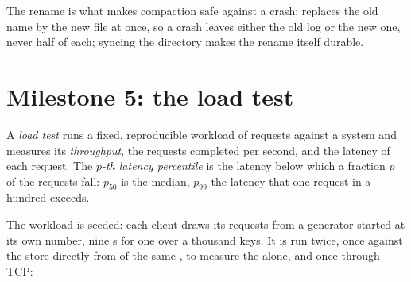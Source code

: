 The rename is what makes compaction safe against a crash:  replaces the old name by the new file at once,
so a crash leaves either the old log or the new one, never half of each; syncing the directory makes the rename itself
durable.

\section{Milestone 5: the load test}\label{sec:b2:project-key-value-server:load}

\begin{definition}\label{def:b2:project-key-value-server:load-test}
A \emph{load test} runs a fixed, reproducible workload of requests against a system and measures its
\emph{throughput}, the requests completed per second, and the latency of each request. The \emph{$p$-th latency
percentile} is the latency below which a fraction $p$ of the requests fall: $p_{50}$ is the
median, $p_{99}$ the latency that one request in a hundred exceeds.
\end{definition}

The workload is seeded: each client draws its requests from a generator started at its own number, nine s for
one  over a thousand keys. It is run twice, once against the store directly from  of the same ,
to measure the  alone, and once through TCP:

\label{lst:b2:project-key-value-server:load}

\label{out:b2:project-key-value-server:load}

